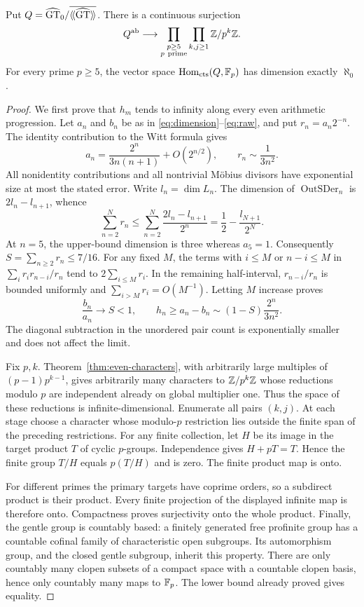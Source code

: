 \begin{corollary}\label{cor:all-orders}
Put $Q=\widehat{\mathrm{GT}}_0/\overline{\langle\!\langle\widehat{\mathrm{GT}}\rangle\!\rangle}$.
There is a continuous surjection
\[
 Q^{\mathrm{ab}}\longrightarrow
       \prod_{\substack{p\geq5\\p\ \mathrm{prime}}}
          \prod_{k,j\geq1}\mathbb Z/p^k\mathbb Z.
\]
For every prime $p\geq5$, the vector space
$\operatorname{Hom}_{\mathrm{cts}}(Q,\mathbb F_p)$ has dimension exactly $\aleph_0$.
\end{corollary}
\begin{proof}
We first prove that $h_m$ tends to infinity along every even arithmetic
progression.  Let $a_n$ and $b_n$ be as in
\eqref{eq:dimension}--\eqref{eq:raw}, and put $r_n=a_n2^{-n}$.
The identity contribution to the Witt formula gives
\[
 a_n=\frac{2^n}{3n(n+1)}+O(2^{n/2}),\qquad
 r_n\sim\frac1{3n^2}.
\]
All nonidentity contributions and all nontrivial M\"obius divisors
have exponential size at most the stated error.
Write $l_n=\dim L_n$.  The dimension of
$\operatorname{OutSDer}_n$ is $2l_n-l_{n+1}$, whence
\[
 \sum_{n=2}^N r_n\leq
 \sum_{n=2}^N\frac{2l_n-l_{n+1}}{2^n}
       =\frac12-\frac{l_{N+1}}{2^N}.
\]
At $n=5$, the upper-bound dimension is three whereas $a_5=1$.
Consequently $S=\sum_{n\geq2}r_n\leq7/16$.
For any fixed $M$, the terms with $i\leq M$ or $n-i\leq M$ in
$\sum_i r_ir_{n-i}/r_n$ tend to $2\sum_{i\leq M}r_i$.
In the remaining half-interval, $r_{n-i}/r_n$ is bounded uniformly
and $\sum_{i>M}r_i=O(M^{-1})$.  Letting $M$ increase proves
\[
 \frac{b_n}{a_n}\longrightarrow S<1,
 \qquad h_n\geq a_n-b_n\sim(1-S)\frac{2^n}{3n^2}.
\]
The diagonal subtraction in the unordered pair count is exponentially
smaller and does not affect the limit.

Fix $p,k$.  Theorem~\ref{thm:even-characters}, with arbitrarily large
multiples of $(p-1)p^{k-1}$, gives arbitrarily many characters to
$\mathbb Z/p^k\mathbb Z$ whose reductions modulo $p$ are independent already on
global multiplier one.  Thus the space of these reductions is
infinite-dimensional.  Enumerate all pairs $(k,j)$.  At each stage
choose a character whose modulo-$p$ restriction lies outside the
finite span of the preceding restrictions.  For any finite collection,
let $H$ be its image in the target product $T$ of cyclic $p$-groups.
Independence gives $H+pT=T$.  Hence the finite group $T/H$ equals
$p(T/H)$ and is zero.  The finite product map is onto.

For different primes the primary targets have coprime orders, so a
subdirect product is their product.  Every finite projection of the
displayed infinite map is therefore onto.  Compactness proves
surjectivity onto the whole product.  Finally, the gentle group is
countably based: a finitely generated free profinite group has a
countable cofinal family of characteristic open subgroups.  Its
automorphism group, and the closed gentle subgroup, inherit this
property.  There are only countably many clopen subsets of a compact
space with a countable clopen basis, hence only countably many maps
to $\mathbb F_p$.  The lower bound already proved gives equality.
\end{proof}

